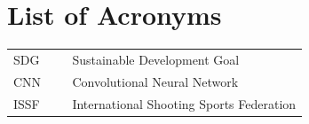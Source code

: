 \chapter*{List of Acronyms}

\begin{flushleft}
\begin{tabular}{l p{0.8\linewidth}}
SDG      & Sustainable Development Goal\\
CNN      & Convolutional Neural Network\\
ISSF     & International Shooting Sports Federation\\
\end{tabular}
\end{flushleft}